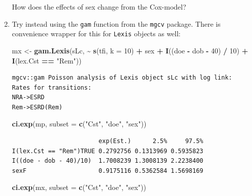 \documentclass[
]{book}
\newenvironment{Shaded}{\begin{snugshade}}{\end{snugshade}}
\newcommand{\AttributeTok}[1]{\textcolor[rgb]{0.13,0.29,0.53}{#1}}
\newcommand{\DecValTok}[1]{\textcolor[rgb]{0.00,0.00,0.81}{#1}}
\newcommand{\FunctionTok}[1]{\textcolor[rgb]{0.13,0.29,0.53}{\textbf{#1}}}
\newcommand{\NormalTok}[1]{#1}
\newcommand{\OtherTok}[1]{\textcolor[rgb]{0.56,0.35,0.01}{#1}}
\newcommand{\SpecialCharTok}[1]{\textcolor[rgb]{0.81,0.36,0.00}{\textbf{#1}}}
\newcommand{\StringTok}[1]{\textcolor[rgb]{0.31,0.60,0.02}{#1}}
\begin{document}
\begin{enumerate}
  How does the effects of sex change from the Cox-model?
\item
  Try instead using the \texttt{gam} function from the
  \texttt{mgcv} package. There is convenience wrapper for this for
  \texttt{Lexis} objects as well:

\begin{Shaded}
\begin{Highlighting}[]
\NormalTok{mx }\OtherTok{\textless{}{-}} \FunctionTok{gam.Lexis}\NormalTok{(sLc,}
                \SpecialCharTok{\textasciitilde{}} \FunctionTok{s}\NormalTok{(tfi, }\AttributeTok{k =} \DecValTok{10}\NormalTok{) }\SpecialCharTok{+} 
\NormalTok{                  sex }\SpecialCharTok{+} \FunctionTok{I}\NormalTok{((doe }\SpecialCharTok{{-}}\NormalTok{ dob }\SpecialCharTok{{-}} \DecValTok{40}\NormalTok{) }\SpecialCharTok{/} \DecValTok{10}\NormalTok{) }\SpecialCharTok{+} 
                  \FunctionTok{I}\NormalTok{(lex.Cst }\SpecialCharTok{==} \StringTok{"Rem"}\NormalTok{))}
\end{Highlighting}
\end{Shaded}

\begin{verbatim}
mgcv::gam Poisson analysis of Lexis object sLc with log link:
Rates for transitions:
NRA->ESRD
Rem->ESRD(Rem)
\end{verbatim}

\begin{Shaded}
\begin{Highlighting}[]
\FunctionTok{ci.exp}\NormalTok{(mp, }\AttributeTok{subset =} \FunctionTok{c}\NormalTok{(}\StringTok{"Cst"}\NormalTok{, }\StringTok{"doe"}\NormalTok{, }\StringTok{"sex"}\NormalTok{))}
\end{Highlighting}
\end{Shaded}

\begin{verbatim}
                        exp(Est.)      2.5%     97.5%
I(lex.Cst == "Rem")TRUE 0.2792756 0.1313969 0.5935823
I((doe - dob - 40)/10)  1.7008239 1.3008139 2.2238400
sexF                    0.9175116 0.5362584 1.5698169
\end{verbatim}

\begin{Shaded}
\begin{Highlighting}[]
\FunctionTok{ci.exp}\NormalTok{(mx, }\AttributeTok{subset =} \FunctionTok{c}\NormalTok{(}\StringTok{"Cst"}\NormalTok{, }\StringTok{"doe"}\NormalTok{, }\StringTok{"sex"}\NormalTok{))}
\end{Highlighting}
\end{Shaded}


\end{enumerate}
\end{document}
